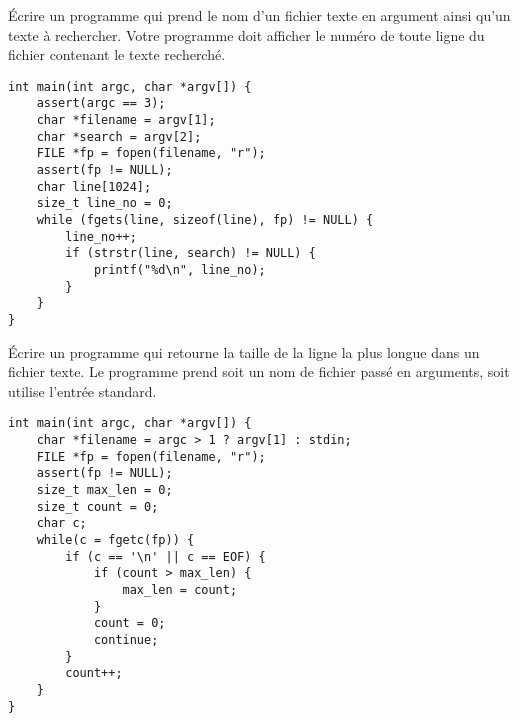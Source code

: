 \documentclass[french,a4paper,addpoints,11pt]{exam}
\begin{document}
\begin{questions}
\question Écrire un programme qui prend le nom d'un fichier texte en argument ainsi qu'un texte à rechercher. Votre programme doit afficher le numéro de toute ligne du fichier contenant le texte recherché.

\begin{solutionordottedlines}[10cm]
\begin{lstlisting}
int main(int argc, char *argv[]) {
    assert(argc == 3);
    char *filename = argv[1];
    char *search = argv[2];
    FILE *fp = fopen(filename, "r");
    assert(fp != NULL);
    char line[1024];
    size_t line_no = 0;
    while (fgets(line, sizeof(line), fp) != NULL) {
        line_no++;
        if (strstr(line, search) != NULL) {
            printf("%d\n", line_no);
        }
    }
}
\end{lstlisting}
\end{solutionordottedlines}

\question Écrire un programme qui retourne la taille de la ligne la plus longue dans un fichier texte. Le programme prend soit un nom de fichier passé en arguments, soit utilise l'entrée standard.

\begin{solutionordottedlines}[10cm]
\begin{lstlisting}
int main(int argc, char *argv[]) {
    char *filename = argc > 1 ? argv[1] : stdin;
    FILE *fp = fopen(filename, "r");
    assert(fp != NULL);
    size_t max_len = 0;
    size_t count = 0;
    char c;
    while(c = fgetc(fp)) {
        if (c == '\n' || c == EOF) {
            if (count > max_len) {
                max_len = count;
            }
            count = 0;
            continue;
        }
        count++;
    }
}
\end{lstlisting}
\end{solutionordottedlines}

\end{questions}
\end{document}
